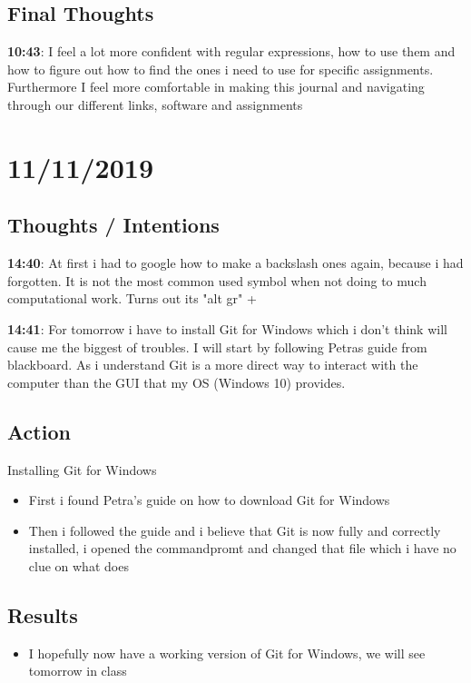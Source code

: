 \documentclass{article}
\begin{document}
\subsection{Final Thoughts}

\textbf{10:43}: I feel a lot more confident with regular expressions, how to use them and how to figure out how to find the ones i need to use for specific assignments. Furthermore I feel more comfortable in making this journal and navigating through our different links, software and assignments 

\section{11/11/2019}

\subsection{Thoughts / Intentions}

\textbf{14:40}: At first i had to google how to make a backslash ones again, because i had forgotten. It is not the most common used symbol when not doing to much computational work. Turns out its "alt gr" + 

\textbf{14:41}: For tomorrow i have to install Git for Windows which i don't think will cause me the biggest of troubles. I will start by following Petras guide from blackboard. As i understand Git is a more direct way to interact with the computer than the GUI that my OS (Windows 10) provides. 

\subsection{Action}

Installing Git for Windows
\begin{itemize}

\item First i found Petra's guide on how to download Git for Windows 
\item Then i followed the guide and i believe that Git is now fully and correctly installed, i opened the commandpromt and changed that file which i have no clue on what does 
    
\end{itemize}

\subsection{Results}
\begin{itemize}
\item I hopefully now have a working version of Git for Windows, we will see tomorrow in class 
\end{itemize}
\end{document}
